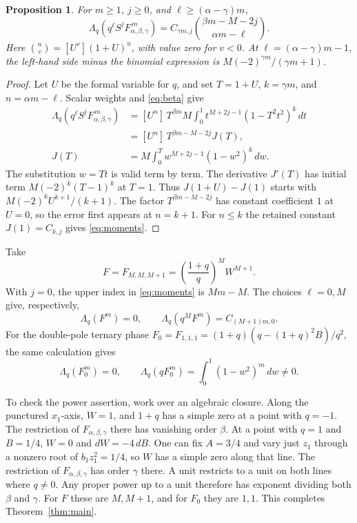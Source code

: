 \documentclass[11pt]{article}
\newtheorem{proposition}[theorem]{Proposition}
\newcommand{\Lq}{\Lambda_q}
\begin{document}
\begin{proposition}\label{prop:moments}
For \(m\ge1\), \(j\ge0\), and \(\ell\ge(\alpha-\gamma)m\),
\begin{equation}\label{eq:moments}
 \Lq(q^\ell S^jF_{\alpha,\beta,\gamma}^{\,m})
    =C_{\gamma m,j}\binom{\beta m-M-2j}{\alpha m-\ell}.
\end{equation}
Here \(\binom uv=[U^v](1+U)^u\), with value zero for \(v<0\). At
\(\ell=(\alpha-\gamma)m-1\), the left-hand side minus the binomial
expression is \(M(-2)^{\gamma m}/(\gamma m+1)\).
\end{proposition}

\begin{proof}
Let \(U\) be the formal variable for \(q\), and set \(T=1+U\),
\(k=\gamma m\), and \(n=\alpha m-\ell\).
Scalar weights and \eqref{eq:beta} give
\[
 \begin{aligned}
 \Lq(q^\ell S^jF_{\alpha,\beta,\gamma}^{\,m})
 &= [U^n]\,T^{\beta m}M\int_0^1 t^{M+2j-1}(1-T^2t^2)^k\,dt\\
 &= [U^n]\,T^{\beta m-M-2j}J(T),\\
 J(T)&=M\int_0^T w^{M+2j-1}(1-w^2)^k\,dw .
 \end{aligned}
\]
The substitution \(w=Tt\) is valid term by term.
The derivative \(J'(T)\) has initial term \(M(-2)^k(T-1)^k\) at
\(T=1\). Thus \(J(1+U)-J(1)\) starts with
\(M(-2)^k U^{k+1}/(k+1)\). The factor \(T^{\beta m-M-2j}\)
has constant coefficient \(1\) at \(U=0\), so the error first
appears at \(n=k+1\). For \(n\le k\) the retained constant
\(J(1)=C_{k,j}\) gives \eqref{eq:moments}.
\end{proof}

Take
\begin{equation}\label{eq:uniform}
 F=F_{M,M,M+1}=\left(\frac{1+q}{q}\right)^M W^{M+1}.
\end{equation}
With \(j=0\), the upper index in \eqref{eq:moments} is \(Mm-M\).
The choices \(\ell=0,M\) give, respectively,
\begin{equation}\label{eq:witness}
 \Lq(F^m)=0,\qquad \Lq(q^M F^m)=C_{(M+1)m,0}.
\end{equation}
For the double-pole ternary phase
\(F_0=F_{1,1,1}=(1+q)(q-(1+q)^2B)/q^2\), the same
calculation gives
\begin{equation}\label{eq:double-pole-ternary}
   \Lq(F_0^m)=0,\qquad
   \Lq(qF_0^m)=\int_0^1 (1-w^2)^m\,dw\ne0 .
\end{equation}

To check the power assertion, work over an algebraic closure.
Along the punctured \(x_1\)-axis, \(W=1\), and \(1+q\) has a simple
zero at a point with \(q=-1\). The restriction of
\(F_{\alpha,\beta,\gamma}\) there has vanishing order \(\beta\).
At a point with \(q=1\) and \(B=1/4\), \(W=0\) and \(dW=-4\,dB\).
One can fix \(A=3/4\) and vary just \(z_1\) through a nonzero root of
\(b_1z_1^2=1/4\), so \(W\) has a simple zero along that line.
The restriction of \(F_{\alpha,\beta,\gamma}\) has order \(\gamma\)
there. A unit restricts to a unit on both lines where \(q\ne0\).
Any proper power up to a unit therefore has exponent dividing
both \(\beta\) and \(\gamma\). For \(F\) these are \(M,M+1\),
and for \(F_0\) they are \(1,1\). This completes
Theorem~\ref{thm:main}.
\end{document}
